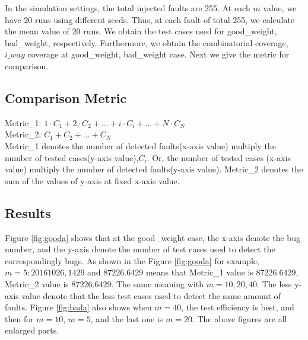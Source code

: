\documentclass[10pt,conference, compsocconf]{IEEEtran}
\begin{document}
\begin{CJK}{UTF8}{gkai}
In the simulation settings, the total injected faults are 255.
At each $m$ value, we have 20 runs using different seeds. 
Thus, at each fault of total 255, we calculate the mean value of 
20 runs. We obtain the test cases used for
good\_weight, bad\_weight, respectively.
Furthermore,
we obtain the combinatorial coverage, $i\_{way}$ coverage at good\_weight,
bad\_weight case. Next we give the metric for comparison. 
\subsection{Comparison Metric}
Metric\_1: $1\cdot{C_1}+2\cdot{C_2}+...+i\cdot{C_i}+...+N\cdot{C_N}$\\
Metric\_2: $C_1+C_2+...+C_N$\\
Metric\_1 denotes the number of detected faults(x-axis value)
multiply the number of tested cases(y-axis value),$C_i$. Or,
the number of tested cases (x-axis value) multiply the number of
detected faults(y-axis value).
Metric\_2 denotes the sum of the values of y-axis at fixed x-axis value. 

\subsection{Results}
Figure \ref{fig:gooda} shows that at the good\_weight case,
the x-axis denote the bug number, and the y-axis denote the number of
test cases used to detect the correspondingly bugs.
As shown in the Figure \ref{fig:gooda}
for example, $m=5: 20161026,1429$  and $87226.6429$ means that  
Metric\_1 value is 87226.6429, Metric\_2 value is 87226.6429.
The same meaning with $m=10,20,40$. 
The less y-axis value denote that the less test cases
used to detect the same amount of faults.  
Figure \ref{fig:bada} also shows when $m=40$,
the test efficiency is best, and then for $m=10$, $m=5$, 
and the last one is $m=20$.
The above figures are all enlarged parts.


\end{CJK}
\end{document}
